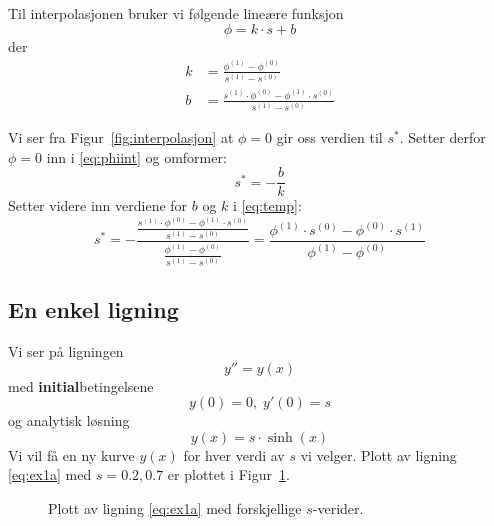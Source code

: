 Til interpolasjonen bruker vi følgende lineære funksjon
\begin{equation}
  \phi = k \cdot s + b \label{eq:phiint}
\end{equation}
der
\begin{align}
  k &= \frac{\phi^{(1)} - \phi^{(0)}}{s^{(1)}-s^{(0)}} \\
  b &= \frac{s^{(1)}\cdot\phi^{(0)} - \phi^{(1)}\cdot s^{(0)}}{s^{(1)}-s^{(0)}}
\end{align}

Vi ser fra Figur~\ref{fig:interpolasjon} at $\phi=0$ gir oss verdien til $s^*$. Setter derfor $\phi=0$ inn i \eqref{eq:phiint} og omformer:
\begin{equation}
  s^* = - \frac{b}{k} \label{eq:temp}
\end{equation}
Setter videre inn verdiene for $b$ og $k$ i \eqref{eq:temp}:
\begin{equation}
  s^* = - \dfrac{\frac{s^{(1)}\cdot\phi^{(0)} - \phi^{(1)}\cdot s^{(0)}}{s^{(1)}-s^{(0)}}}{\frac{\phi^{(1)} - \phi^{(0)}}{s^{(1)}-s^{(0)}}}
      = \dfrac{\phi^{(1)}\cdot s^{(0)} - \phi^{(0)}\cdot s^{(1)}}{\phi^{(1)} - \phi^{(0)}}
\end{equation}


\clearpage

\subsection{En enkel ligning} %
\label{sub:en_enkel_ligning}

Vi ser på ligningen
\begin{equation}
  y'' = y(x) \label{eq:ex1eq}
\end{equation}
med \textbf{initial}betingelsene
\begin{equation}
  y(0) = 0, \; y'(0) = s \tag{ib} \label{eq:ex1b}
\end{equation}
og analytisk løsning
\begin{equation}
  y(x) = s\cdot \sinh(x) \tag{a} \label{eq:ex1a}
\end{equation}
Vi vil få en ny kurve $y(x)$ for hver verdi av $s$ vi velger. Plott av ligning \eqref{eq:ex1a} med $s=0.2, 0.7$ er plottet i Figur~\ref{fig:s_verdier}.

\begin{figure}[htb]
  \centering
  \caption{Plott av ligning \eqref{eq:ex1a} med forskjellige $s$-verider.}
  \label{fig:s_verdier}
\end{figure}

